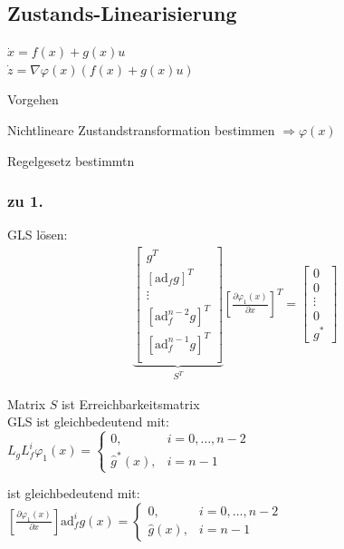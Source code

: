 \documentclass[german]{latex4ei/latex4ei_sheet}
\begin{document}
\begin{sectionbox}
\subsection{Zustands-Linearisierung}
$\dot{x} = f(x) + g(x)u$ \\
$\dot{z} = \nabla \varphi(x) \left( f(x) + g(x)u \right)$
\begin{cookbox}{Vorgehen}
  \item Nichtlineare Zustandstransformation bestimmen $\Rightarrow \varphi(x)$
  \item Regelgesetz bestimmtn
\end{cookbox}

\subsubsection{zu 1.}
GLS lösen: \\
\begin{align*}
  \underbrace{
  \begin{bmatrix}
    g^T \\
    [\text{ad}_f g]^T \\
    \vdots \\
    [\text{ad}^{n-2}_f g]^T \\
    [\text{ad}^{n-1}_f g]^T \\
  \end{bmatrix}
  }_{S^T}
  \left[ \frac{\partial \varphi_1(x)}{\partial x} \right]^T
  =
  \begin{bmatrix}
    0 \\
    0 \\
    \vdots \\
    0 \\
    g^*
  \end{bmatrix}
\end{align*}

Matrix $S$ ist Erreichbarkeitsmatrix \\

GLS ist gleichbedeutend mit: \\
$ L_g L_f^i \varphi_1(x) =
\begin{cases}
  0, & i = 0, \dots, n-2 \\
  \hat{g}^*(x), & i = n-1
\end{cases}$

ist gleichbedeutend mit: \\
$\left[ \frac{\partial \varphi_1(x)}{\partial x} \right] \text{ad}_f^i g(x) =
\begin{cases}
  0, & i = 0, \dots, n-2 \\
  \hat{g}(x), & i = n-1
\end{cases}$


\end{sectionbox}
\end{document}
